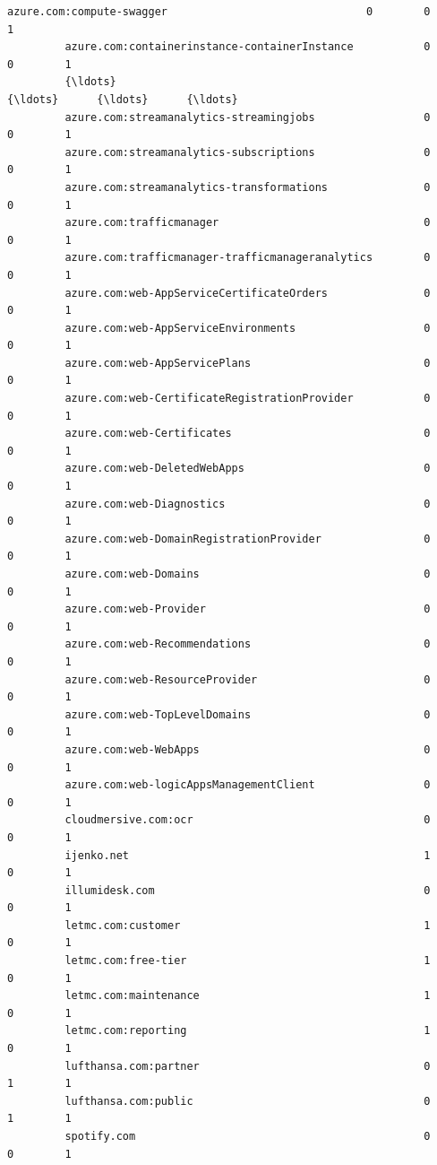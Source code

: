 \documentclass[11pt]{article}
\begin{document}
\begin{Verbatim}[commandchars=\\\{\}]
         azure.com:compute-swagger                               0        0        1   
         azure.com:containerinstance-containerInstance           0        0        1   
         {\ldots}                                                   {\ldots}      {\ldots}      {\ldots}   
         azure.com:streamanalytics-streamingjobs                 0        0        1   
         azure.com:streamanalytics-subscriptions                 0        0        1   
         azure.com:streamanalytics-transformations               0        0        1   
         azure.com:trafficmanager                                0        0        1   
         azure.com:trafficmanager-trafficmanageranalytics        0        0        1   
         azure.com:web-AppServiceCertificateOrders               0        0        1   
         azure.com:web-AppServiceEnvironments                    0        0        1   
         azure.com:web-AppServicePlans                           0        0        1   
         azure.com:web-CertificateRegistrationProvider           0        0        1   
         azure.com:web-Certificates                              0        0        1   
         azure.com:web-DeletedWebApps                            0        0        1   
         azure.com:web-Diagnostics                               0        0        1   
         azure.com:web-DomainRegistrationProvider                0        0        1   
         azure.com:web-Domains                                   0        0        1   
         azure.com:web-Provider                                  0        0        1   
         azure.com:web-Recommendations                           0        0        1   
         azure.com:web-ResourceProvider                          0        0        1   
         azure.com:web-TopLevelDomains                           0        0        1   
         azure.com:web-WebApps                                   0        0        1   
         azure.com:web-logicAppsManagementClient                 0        0        1   
         cloudmersive.com:ocr                                    0        0        1   
         ijenko.net                                              1        0        1   
         illumidesk.com                                          0        0        1   
         letmc.com:customer                                      1        0        1   
         letmc.com:free-tier                                     1        0        1   
         letmc.com:maintenance                                   1        0        1   
         letmc.com:reporting                                     1        0        1   
         lufthansa.com:partner                                   0        1        1   
         lufthansa.com:public                                    0        1        1   
         spotify.com                                             0        0        1   
         

\end{Verbatim}
\end{document}
